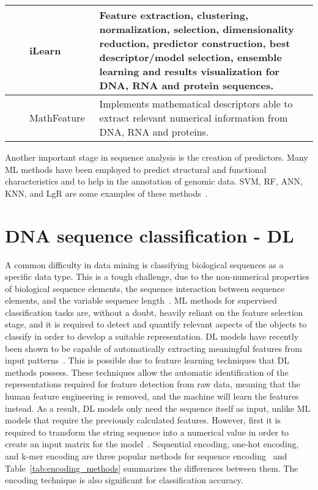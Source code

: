 \begin{table}[ht]
\begin{tabular}{lp{2cm}p{3.5cm}p{7cm}}
	\citeyear{Chen2019ILearn:Data} & \citeauthor{Chen2019ILearn:Data} & iLearn~\cite{Chen2019ILearn:Data} & Feature extraction, clustering, normalization, selection, dimensionality reduction, predictor construction, best descriptor/model selection, ensemble learning and results visualization for \gls{DNA}, \gls{RNA} and protein sequences.\\\midrule
	
	\citeyear{Bonidia2021MathFeature:Descriptors} & \citeauthor{Bonidia2021MathFeature:Descriptors} & MathFeature~\cite{Bonidia2021MathFeature:Descriptors} & Implements mathematical descriptors able to extract relevant numerical information from \gls{DNA}, \gls{RNA} and proteins.\\
    
	\bottomrule
\end{tabular}
\end{table}

Another important stage in sequence analysis is the creation of predictors. Many \gls{ML} methods have been employed to predict structural and functional characteristics and to help in the annotation of genomic data. \gls{SVM}, \gls{RF}, \gls{ANN}, \gls{KNN}, and \gls{LgR} are some examples of these methods~\cite{Chen2019ILearn:Data}.



\section{DNA sequence classification - DL}\label{sec:dna-dl}

A common difficulty in data mining is classifying biological sequences as a specific data type. This is a tough challenge, due to the non-numerical properties of biological sequence elements, the sequence interaction between sequence elements, and the variable sequence length~\cite{Yang2020ReviewDNA}. \gls{ML} methods for supervised classification tasks are, without a doubt, heavily reliant on the feature selection stage, and it is required to detect and quantify relevant aspects of the objects to classify in order to develop a suitable representation. \gls{DL} models have recently been shown to be capable of automatically extracting meaningful features from input patterns~\cite{LoBosco2017DeepClassification}. This is possible due to feature learning techniques that \gls{DL} methods possess. These techniques allow the automatic identification of the representations required for feature detection from raw data, meaning that the human feature engineering is removed, and the machine will learn the features instead. As a result, \gls{DL} models only need the sequence itself as input, unlike \gls{ML} models that require the previously calculated features. However, first it is required to transform the string sequence into a numerical value in order to create an input matrix for the model~\cite{Yang2020ReviewDNA}. Sequential encoding, one-hot encoding, and k-mer encoding are three popular methods for sequence encoding~\cite{Choong2017EvaluationMethod} and Table~\ref{tab:encoding_methods} summarizes the differences between them. The encoding technique is also significant for classification accuracy.


